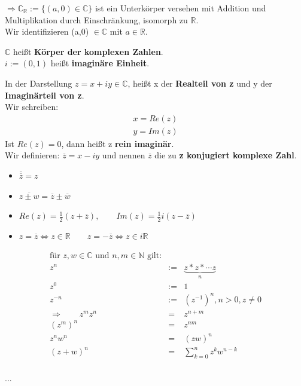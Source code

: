$\Rightarrow \mathds{C}_{\mathds{R}}:= \{(a,0) \in \mathds{C}\}$ ist ein Unterkörper versehen mit Addition und Multiplikation durch Einschränkung, isomorph zu $\mathds{R}$.\\
Wir identifizieren (a,0) $\in \mathds{C}$ mit $a \in \mathds{R}$.\\

\begin{definition}
	$\mathds{C}$ heißt \textbf{Körper der komplexen Zahlen}.\\
	$i := (0,1)$ heißt \textbf{imaginäre Einheit}.
\end{definition}

In der Darstellung $z=x+iy \in \mathds{C}$, heißt x der \textbf{Realteil von z} und y der \textbf{Imaginärteil von z}.\\
Wir schreiben:
\begin{eqnarray*}
x= Re(z)\\
y = Im(z)
\end{eqnarray*}
Ist $Re(z) = 0$, dann heißt z \textbf{rein imaginär}.\\
Wir definieren: $\overline{z}= x-iy$ und nennen $\overline{z}$ die zu \textbf{z konjugiert komplexe Zahl}.\\
\begin{itemize}
	\item $\overline{\overline{z}} = z$
	\item $\overline{z \pm w} = \overline{z} \pm \overline{w}$
	\item $Re(z) = \frac{1}{2}(z + \overline{z}), \qquad Im(z)= \frac{1}{2}i(z-\overline{z})$
	\item $z=\overline{z} \Leftrightarrow z \in \mathds{R}\qquad z=-\overline{z} \Leftrightarrow z \in i\mathds{R}$
\end{itemize}

\begin{bemerkung}
\begin{eqnarray*}
	\text{für } z,w \in \mathds{C} \text{ und } n,m \in \mathds{N} \text{ gilt:}\\
	z^n &:=& \underbrace{z*z *\cdots z}_{n} \\
	z^0 &:=& 1\\
	z^{-n} &:=& (z^{-1})^{n}, n>0, z \neq 0\\
	\Rightarrow \qquad z^m z^n&=&z^{n+m}\\
	(z^m)^n &=& z^{nm}\\
	z^n w^n &=& (zw)^n\\
	(z+w)^n &=& \sum^n_{k=0} z^k w^{n-k}\\
\end{eqnarray*}

...\\
\end{bemerkung}

